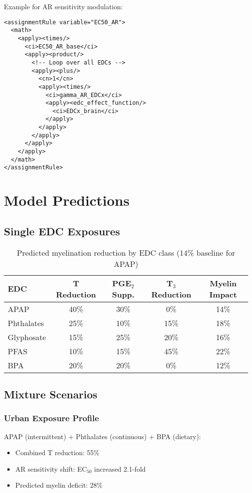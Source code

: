 \documentclass[11pt]{article}
\begin{document}
Example for AR sensitivity modulation:
\begin{verbatim}
<assignmentRule variable="EC50_AR">
  <math>
    <apply><times/>
      <ci>EC50_AR_base</ci>
      <apply><product/>
        <!-- Loop over all EDCs -->
        <apply><plus/>
          <cn>1</cn>
          <apply><times/>
            <ci>gamma_AR_EDCx</ci>
            <apply><edc_effect_function/>
              <ci>EDCx_brain</ci>
            </apply>
          </apply>
        </apply>
      </apply>
    </apply>
  </math>
</assignmentRule>
\end{verbatim}

\section{Model Predictions}

\subsection{Single EDC Exposures}

\begin{table}[h]
\centering
\caption{Predicted myelination reduction by EDC class (14\% baseline for APAP)}
\begin{tabular}{lcccc}
\toprule
EDC & T Reduction & PGE$_2$ Supp. & T$_3$ Reduction & Myelin Impact \\
\midrule
APAP & 40\% & 30\% & 0\% & 14\% \\
Phthalates & 25\% & 10\% & 15\% & 18\% \\
Glyphosate & 15\% & 25\% & 20\% & 16\% \\
PFAS & 10\% & 15\% & 45\% & 22\% \\
BPA & 20\% & 20\% & 0\% & 12\% \\
\bottomrule
\end{tabular}
\end{table}

\subsection{Mixture Scenarios}

\subsubsection{Urban Exposure Profile}
APAP (intermittent) + Phthalates (continuous) + BPA (dietary):
\begin{itemize}
\item Combined T reduction: 55\%
\item AR sensitivity shift: EC$_{50}$ increased 2.1-fold
\item Predicted myelin deficit: 28\%
\end{itemize}
\end{document}
